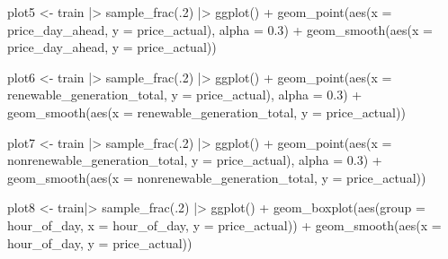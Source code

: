 \documentclass[
]{article}
\newenvironment{Shaded}{\begin{snugshade}}{\end{snugshade}}
\newcommand{\AttributeTok}[1]{\textcolor[rgb]{0.40,0.45,0.13}{#1}}
\newcommand{\DecValTok}[1]{\textcolor[rgb]{0.68,0.00,0.00}{#1}}
\newcommand{\FloatTok}[1]{\textcolor[rgb]{0.68,0.00,0.00}{#1}}
\newcommand{\FunctionTok}[1]{\textcolor[rgb]{0.28,0.35,0.67}{#1}}
\newcommand{\NormalTok}[1]{\textcolor[rgb]{0.00,0.23,0.31}{#1}}
\newcommand{\OtherTok}[1]{\textcolor[rgb]{0.00,0.23,0.31}{#1}}
\newcommand{\SpecialCharTok}[1]{\textcolor[rgb]{0.37,0.37,0.37}{#1}}
\begin{document}
\begin{Shaded}
\begin{Highlighting}[]
\NormalTok{plot5 }\OtherTok{\textless{}{-}}\NormalTok{ train }\SpecialCharTok{|\textgreater{}}
  \FunctionTok{sample\_frac}\NormalTok{(.}\DecValTok{2}\NormalTok{) }\SpecialCharTok{|\textgreater{}}
  \FunctionTok{ggplot}\NormalTok{() }\SpecialCharTok{+}
  \FunctionTok{geom\_point}\NormalTok{(}\FunctionTok{aes}\NormalTok{(}\AttributeTok{x =}\NormalTok{ price\_day\_ahead, }\AttributeTok{y =}\NormalTok{ price\_actual), }\AttributeTok{alpha =} \FloatTok{0.3}\NormalTok{) }\SpecialCharTok{+}
  \FunctionTok{geom\_smooth}\NormalTok{(}\FunctionTok{aes}\NormalTok{(}\AttributeTok{x =}\NormalTok{ price\_day\_ahead, }\AttributeTok{y =}\NormalTok{ price\_actual))}

\NormalTok{plot6 }\OtherTok{\textless{}{-}}\NormalTok{ train }\SpecialCharTok{|\textgreater{}}
  \FunctionTok{sample\_frac}\NormalTok{(.}\DecValTok{2}\NormalTok{) }\SpecialCharTok{|\textgreater{}}
  \FunctionTok{ggplot}\NormalTok{() }\SpecialCharTok{+}
  \FunctionTok{geom\_point}\NormalTok{(}\FunctionTok{aes}\NormalTok{(}\AttributeTok{x =}\NormalTok{ renewable\_generation\_total, }\AttributeTok{y =}\NormalTok{ price\_actual), }\AttributeTok{alpha =} \FloatTok{0.3}\NormalTok{) }\SpecialCharTok{+}
  \FunctionTok{geom\_smooth}\NormalTok{(}\FunctionTok{aes}\NormalTok{(}\AttributeTok{x =}\NormalTok{ renewable\_generation\_total, }\AttributeTok{y =}\NormalTok{ price\_actual))}

\NormalTok{plot7 }\OtherTok{\textless{}{-}}\NormalTok{ train }\SpecialCharTok{|\textgreater{}}
  \FunctionTok{sample\_frac}\NormalTok{(.}\DecValTok{2}\NormalTok{) }\SpecialCharTok{|\textgreater{}}
  \FunctionTok{ggplot}\NormalTok{() }\SpecialCharTok{+}
  \FunctionTok{geom\_point}\NormalTok{(}\FunctionTok{aes}\NormalTok{(}\AttributeTok{x =}\NormalTok{ nonrenewable\_generation\_total, }\AttributeTok{y =}\NormalTok{ price\_actual), }\AttributeTok{alpha =} \FloatTok{0.3}\NormalTok{) }\SpecialCharTok{+}
  \FunctionTok{geom\_smooth}\NormalTok{(}\FunctionTok{aes}\NormalTok{(}\AttributeTok{x =}\NormalTok{ nonrenewable\_generation\_total, }\AttributeTok{y =}\NormalTok{ price\_actual))}

\NormalTok{plot8 }\OtherTok{\textless{}{-}}\NormalTok{ train}\SpecialCharTok{|\textgreater{}}
  \FunctionTok{sample\_frac}\NormalTok{(.}\DecValTok{2}\NormalTok{) }\SpecialCharTok{|\textgreater{}}
  \FunctionTok{ggplot}\NormalTok{() }\SpecialCharTok{+}
  \FunctionTok{geom\_boxplot}\NormalTok{(}\FunctionTok{aes}\NormalTok{(}\AttributeTok{group =}\NormalTok{ hour\_of\_day, }\AttributeTok{x =}\NormalTok{ hour\_of\_day, }\AttributeTok{y =}\NormalTok{ price\_actual)) }\SpecialCharTok{+}
  \FunctionTok{geom\_smooth}\NormalTok{(}\FunctionTok{aes}\NormalTok{(}\AttributeTok{x =}\NormalTok{ hour\_of\_day, }\AttributeTok{y =}\NormalTok{ price\_actual))}


\end{Highlighting}
\end{Shaded}
\end{document}

